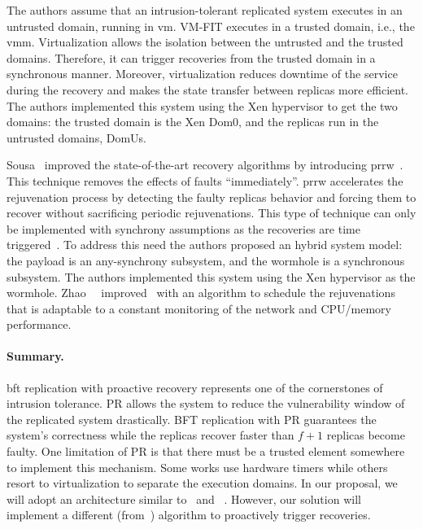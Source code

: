 The authors assume that an intrusion-tolerant replicated system executes in an untrusted domain, running in \gls{vm}. 
VM-FIT executes in a trusted domain, i.e., the \gls{vmm}. 
Virtualization allows the isolation between the untrusted and the trusted domains. 
Therefore, it can trigger recoveries from the trusted domain in a synchronous manner. 
Moreover, virtualization reduces downtime of the service during the recovery and makes the state transfer between replicas more efficient. 
The authors implemented this system using the Xen hypervisor to get the two domains: the trusted domain is the Xen Dom0, and the replicas run in the untrusted domains, DomUs.

Sousa~\etal{} improved the state-of-the-art recovery algorithms by introducing \gls{prrw}~\cite{Sousa:2010}. 
This technique removes the effects of faults ``immediately''. 
\gls{prrw} accelerates the rejuvenation process by detecting the faulty replicas behavior and forcing them to recover without sacrificing periodic rejuvenations. 
This type of technique can only be implemented with synchrony assumptions as the recoveries are time triggered~\cite{Sousa:2005}. 
To address this need the authors proposed an hybrid system model: the payload is an any-synchrony subsystem, and the wormhole is a synchronous subsystem. 
The authors implemented this system using the Xen hypervisor as the wormhole. 
Zhao~\etal{}~\cite{Zhao:2010} improved~\cite{Sousa:2010} with an algorithm to schedule the rejuvenations that is adaptable to a constant monitoring of the network and CPU/memory performance.

\paragraph{Summary.} \gls{bft} replication with proactive recovery represents one of the cornerstones of intrusion tolerance. 
PR allows the system to reduce the vulnerability window of the replicated system drastically. 
BFT replication with PR guarantees the system's correctness while the replicas recover faster than $f+1$ replicas become faulty. 
One limitation of PR is that there must be a trusted element somewhere to implement this mechanism. 
Some works use hardware timers while others resort to virtualization to separate the execution domains. 
In our proposal, we will adopt an architecture similar to~\cite{Distler:2008} and ~\cite{Sousa:2010}. 
However, our solution will implement a different (from~\cite{Sousa:2010}) algorithm to proactively trigger recoveries.


